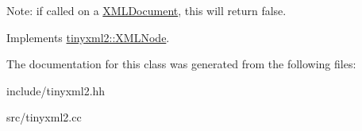 Note\+: if called on a \hyperlink{classtinyxml2_1_1XMLDocument}{X\+M\+L\+Document}, this will return false. 

Implements \hyperlink{classtinyxml2_1_1XMLNode_a7ce18b751c3ea09eac292dca264f9226}{tinyxml2\+::\+X\+M\+L\+Node}.



The documentation for this class was generated from the following files\+:\begin{DoxyCompactItemize}
\item 
include/tinyxml2.\+hh\item 
src/tinyxml2.\+cc\end{DoxyCompactItemize}

